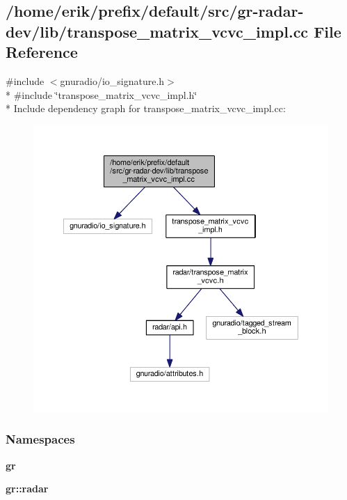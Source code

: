 \subsection{/home/erik/prefix/default/src/gr-\/radar-\/dev/lib/transpose\+\_\+matrix\+\_\+vcvc\+\_\+impl.cc File Reference}
\label{transpose__matrix__vcvc__impl_8cc}
{\ttfamily \#include $<$gnuradio/io\+\_\+signature.\+h$>$}\\*
{\ttfamily \#include \char`\"{}transpose\+\_\+matrix\+\_\+vcvc\+\_\+impl.\+h\char`\"{}}\\*
Include dependency graph for transpose\+\_\+matrix\+\_\+vcvc\+\_\+impl.\+cc\+:
\nopagebreak
\begin{figure}[H]
\begin{center}
\leavevmode
\includegraphics[width=350pt]{dc/d88/transpose__matrix__vcvc__impl_8cc__incl}
\end{center}
\end{figure}
\subsubsection*{Namespaces}
\begin{DoxyCompactItemize}
\item 
 {\bf gr}
\item 
 {\bf gr\+::radar}
\end{DoxyCompactItemize}
